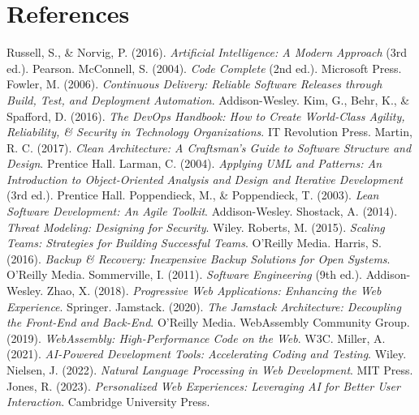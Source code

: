 \section{References}
\small
\begin{multicols}{2}
\begin{thebibliography}{99}
 Russell, S., \& Norvig, P. (2016). \textit{Artificial Intelligence: A Modern Approach} (3rd ed.). Pearson.
 McConnell, S. (2004). \textit{Code Complete} (2nd ed.). Microsoft Press.
 Fowler, M. (2006). \textit{Continuous Delivery: Reliable Software Releases through Build, Test, and Deployment Automation}. Addison-Wesley.
 Kim, G., Behr, K., \& Spafford, D. (2016). \textit{The DevOps Handbook: How to Create World-Class Agility, Reliability, \& Security in Technology Organizations}. IT Revolution Press.
 Martin, R. C. (2017). \textit{Clean Architecture: A Craftsman's Guide to Software Structure and Design}. Prentice Hall.
 Larman, C. (2004). \textit{Applying UML and Patterns: An Introduction to Object-Oriented Analysis and Design and Iterative Development} (3rd ed.). Prentice Hall.
 Poppendieck, M., \& Poppendieck, T. (2003). \textit{Lean Software Development: An Agile Toolkit}. Addison-Wesley.
 Shostack, A. (2014). \textit{Threat Modeling: Designing for Security}. Wiley.
 Roberts, M. (2015). \textit{Scaling Teams: Strategies for Building Successful Teams}. O'Reilly Media.
 Harris, S. (2016). \textit{Backup \& Recovery: Inexpensive Backup Solutions for Open Systems}. O'Reilly Media.
 Sommerville, I. (2011). \textit{Software Engineering} (9th ed.). Addison-Wesley.
 Zhao, X. (2018). \textit{Progressive Web Applications: Enhancing the Web Experience}. Springer.
 Jamstack. (2020). \textit{The Jamstack Architecture: Decoupling the Front-End and Back-End}. O'Reilly Media.
 WebAssembly Community Group. (2019). \textit{WebAssembly: High-Performance Code on the Web}. W3C.
 Miller, A. (2021). \textit{AI-Powered Development Tools: Accelerating Coding and Testing}. Wiley.
 Nielsen, J. (2022). \textit{Natural Language Processing in Web Development}. MIT Press.
 Jones, R. (2023). \textit{Personalized Web Experiences: Leveraging AI for Better User Interaction}. Cambridge University Press.

\end{thebibliography}
\end{multicols}
